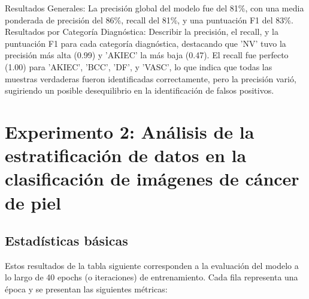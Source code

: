 Resultados Generales: La precisión global del modelo fue del 81\%, con una media ponderada de precisión del 86\%, recall del 81\%, y una puntuación F1 del 83\%.
Resultados por Categoría Diagnóstica: Describir la precisión, el recall, y la puntuación F1 para cada categoría diagnóstica, destacando que 'NV' tuvo la precisión más alta (0.99) y 'AKIEC' la más baja (0.47). El recall fue perfecto (1.00) para 'AKIEC', 'BCC', 'DF', y 'VASC', lo que indica que todas las muestras verdaderas fueron identificadas correctamente, pero la precisión varió, sugiriendo un posible desequilibrio en la identificación de falsos positivos.

\section{Experimento 2: Análisis de la estratificación de datos en la clasificación de imágenes de cáncer de piel}

\subsection*{Estadísticas básicas}\label{sub:basic_statistics_p2}
    
    Estos resultados de la tabla siguiente corresponden a la evaluación del modelo a lo largo de 40 epochs (o iteraciones) de entrenamiento. Cada fila representa una época y se presentan las siguientes métricas:
    
